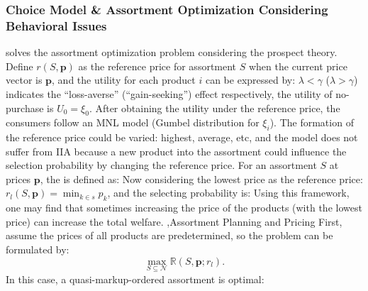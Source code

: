 \documentclass[10pt]{report}
\begin{document}
\subsubsection{Choice Model \& Assortment Optimization Considering Behavioral Issues}
\cite{wang2018prospect} solves the assortment optimization problem considering the prospect theory. 
Define $r(S,\mathbf{p})$ as the reference price for assortment $S$ when the current price vector is $\mathbf{p}$, and the utility for each product $i$ can be expressed by:
$\lambda<\gamma$ ($\lambda>\gamma$) indicates the ``loss-averse'' (``gain-seeking'') effect respectively, the utility of no-purchase is $U_0=\xi_0$. 
After obtaining the utility under the reference price, the consumers follow an MNL model (Gumbel distribution for $\xi_i$). 
The formation of the reference price could be varied: highest, average, etc, and the model does not suffer from IIA because a new product into the assortment could influence the selection probability by changing the reference price. 
For an assortment $S$ at prices $\mathbf{p}$, the  is defined as:
Now considering the lowest price as the reference price: $r_l(S,\mathbf{p})=\min_{k\in s}p_k$, and the selecting probability is:
Using this framework, one may find that sometimes increasing the price of the products (with the lowest price) can increase the total welfare.
\sep{Assortment Planning and Pricing}
First, assume the prices of all products are predetermined, so the problem can be formulated by:
\[
    \max_{S\subseteq\mathcal{N}}\mathbb{R}(S,\mathbf{p};r_l).
\]
In this case, a quasi-markup-ordered assortment is optimal:
\end{document}

